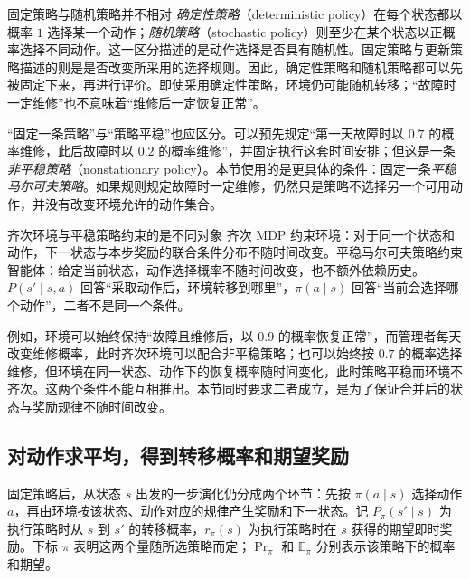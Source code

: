 \documentclass[UTF8,12pt,a4paper,fontset=fandol]{ctexart}
\begin{document}
\begin{remarkbox}[label={rem:markov-three-fixed-policy}]{固定策略与随机策略并不相对}
\emph{确定性策略}（deterministic policy）在每个状态都以概率 $1$ 选择某一个动作；\emph{随机策略}（stochastic policy）则至少在某个状态以正概率选择不同动作。这一区分描述的是动作选择是否具有随机性。固定策略与更新策略描述的则是是否改变所采用的选择规则。因此，确定性策略和随机策略都可以先被固定下来，再进行评价。即使采用确定性策略，环境仍可能随机转移；“故障时一定维修”也不意味着“维修后一定恢复正常”。

\tcblower
“固定一条策略”与“策略平稳”也应区分。可以预先规定“第一天故障时以 $0.7$ 的概率维修，此后故障时以 $0.2$ 的概率维修”，并固定执行这套时间安排；但这是一条\emph{非平稳策略}（nonstationary policy）。本节使用的是更具体的条件：固定一条\emph{平稳马尔可夫策略}。如果规则规定故障时一定维修，仍然只是策略不选择另一个可用动作，并没有改变环境允许的动作集合。
\end{remarkbox}

\begin{remarkbox}[label={rem:markov-three-environment-policy}]{齐次环境与平稳策略约束的是不同对象}
齐次 MDP 约束环境：对于同一个状态和动作，下一状态与本步奖励的联合条件分布不随时间改变。平稳马尔可夫策略约束智能体：给定当前状态，动作选择概率不随时间改变，也不额外依赖历史。$P(s'\mid s,a)$ 回答“采取动作后，环境转移到哪里”，$\pi(a\mid s)$ 回答“当前会选择哪个动作”，二者不是同一个条件。

例如，环境可以始终保持“故障且维修后，以 $0.9$ 的概率恢复正常”，而管理者每天改变维修概率，此时齐次环境可以配合非平稳策略；也可以始终按 $0.7$ 的概率选择维修，但环境在同一状态、动作下的恢复概率随时间变化，此时策略平稳而环境不齐次。这两个条件不能互相推出。本节同时要求二者成立，是为了保证合并后的状态与奖励规律不随时间改变。
\end{remarkbox}

\subsection{对动作求平均，得到转移概率和期望奖励}

固定策略后，从状态 $s$ 出发的一步演化仍分成两个环节：先按 $\pi(a\mid s)$ 选择动作 $a$，再由环境按该状态、动作对应的规律产生奖励和下一状态。记 $P_\pi(s'\mid s)$ 为执行策略时从 $s$ 到 $s'$ 的转移概率，$r_\pi(s)$ 为执行策略时在 $s$ 获得的期望即时奖励。下标 $\pi$ 表明这两个量随所选策略而定；$\Pr_\pi$ 和 $\mathbb E_\pi$ 分别表示该策略下的概率和期望。
\end{document}
